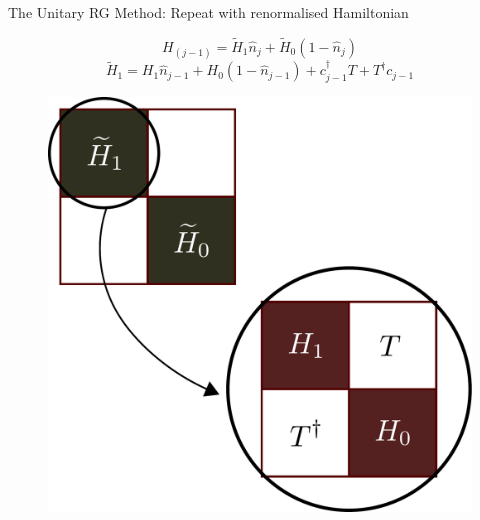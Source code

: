 \documentclass[10pt,aspectratio=169]{beamer}
\begin{document}
\begin{frame}[noframenumbering]{The Unitary RG Method: Repeat with renormalised Hamiltonian}

\begin{minipage}{0.53\textwidth}
	\[H_{(j-1)} = \widetilde H_1 \hat n_j + \widetilde H_0 \left(1 - \hat n_j\right)\]
	\[\widetilde H_1 = H_1 \hat n_{j-1} + H_0 \left(1 - \hat n_{j-1}\right) + c^\dagger_{j-1} T + T^\dagger c_{j-1}\]
\vspace*{\fill}
\end{minipage}
\hspace*{\fill}
\begin{minipage}{0.45\textwidth}
\begin{figure}
	\includegraphics[width=\textwidth]{figures/urg_next.pdf}
\end{figure}
\end{minipage}
\end{frame}
\end{document}
